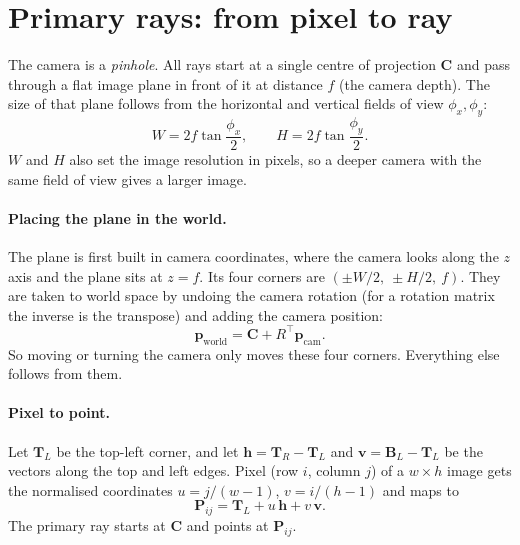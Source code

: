 \documentclass[11pt,a4paper]{article}
\newcommand{\vv}[1]{\mathbf{#1}}
\begin{document}
\section{Primary rays: from pixel to ray}

The camera is a \emph{pinhole}. All rays start at a single centre of projection
$\vv C$ and pass through a flat image plane in front of it at distance $f$ (the
camera depth). The size of that plane follows from the horizontal and vertical
fields of view $\phi_x,\phi_y$:
\[
  W = 2f\tan\frac{\phi_x}{2}, \qquad H = 2f\tan\frac{\phi_y}{2}.
\]
$W$ and $H$ also set the image resolution in pixels, so a deeper camera with the
same field of view gives a larger image.

\paragraph{Placing the plane in the world.} The plane is first built in camera
coordinates, where the camera looks along the $z$ axis and the plane sits at
$z=f$. Its four corners are $(\pm W/2,\ \pm H/2,\ f)$. They are taken to world
space by undoing the camera rotation (for a rotation matrix the inverse is the
transpose) and adding the camera position:
\[
  \vv p_{\text{world}} = \vv C + R^{\top}\vv p_{\text{cam}} .
\]
So moving or turning the camera only moves these four corners. Everything else
follows from them.

\paragraph{Pixel to point.} Let $\vv T_L$ be the top-left corner, and let
$\vv h = \vv T_R-\vv T_L$ and $\vv v = \vv B_L-\vv T_L$ be the vectors along the
top and left edges. Pixel (row $i$, column $j$) of a $w\times h$ image gets the
normalised coordinates $u = j/(w-1)$, $v = i/(h-1)$ and maps to
\[
  \vv P_{ij} = \vv T_L + u\,\vv h + v\,\vv v .
\]
The primary ray starts at $\vv C$ and points at $\vv P_{ij}$.
\end{document}
